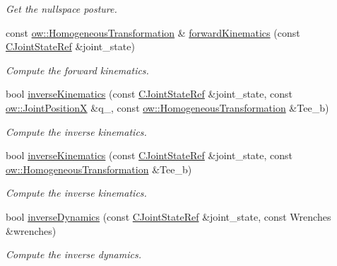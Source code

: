 \begin{DoxyCompactItemize}
\begin{DoxyCompactList}\small\item\em Get the nullspace posture. \end{DoxyCompactList}\item 
const \hyperlink{classow__core_1_1HomogeneousTransformation}{ow\+::\+Homogeneous\+Transformation} \& \hyperlink{classow__ik_1_1RobotLimb_a4a26e5c8e5c6861fc36e1613fb02a42a}{forward\+Kinematics} (const \hyperlink{classow__core_1_1JointStateRef}{C\+Joint\+State\+Ref} \&joint\+\_\+state)
\begin{DoxyCompactList}\small\item\em Compute the forward kinematics. \end{DoxyCompactList}\item 
bool \hyperlink{classow__ik_1_1RobotLimb_aa9abf5f371b603f29ba0e8cd7144cc45}{inverse\+Kinematics} (const \hyperlink{classow__core_1_1JointStateRef}{C\+Joint\+State\+Ref} \&joint\+\_\+state, const \hyperlink{classow__core_1_1JointPosition}{ow\+::\+Joint\+PositionX} \&q\+\_, const \hyperlink{classow__core_1_1HomogeneousTransformation}{ow\+::\+Homogeneous\+Transformation} \&Tee\+\_\+b)
\begin{DoxyCompactList}\small\item\em Compute the inverse kinematics. \end{DoxyCompactList}\item 
bool \hyperlink{classow__ik_1_1RobotLimb_aefe0ad5c913ae0e440451a702a1b5a26}{inverse\+Kinematics} (const \hyperlink{classow__core_1_1JointStateRef}{C\+Joint\+State\+Ref} \&joint\+\_\+state, const \hyperlink{classow__core_1_1HomogeneousTransformation}{ow\+::\+Homogeneous\+Transformation} \&Tee\+\_\+b)
\begin{DoxyCompactList}\small\item\em Compute the inverse kinematics. \end{DoxyCompactList}\item 
bool \hyperlink{classow__ik_1_1RobotLimb_ab263452af24b2a8f0e5239cc3337b4a2}{inverse\+Dynamics} (const \hyperlink{classow__core_1_1JointStateRef}{C\+Joint\+State\+Ref} \&joint\+\_\+state, const Wrenches \&wrenches)
\begin{DoxyCompactList}\small\item\em Compute the inverse dynamics. \end{DoxyCompactList}\end{DoxyCompactItemize}
